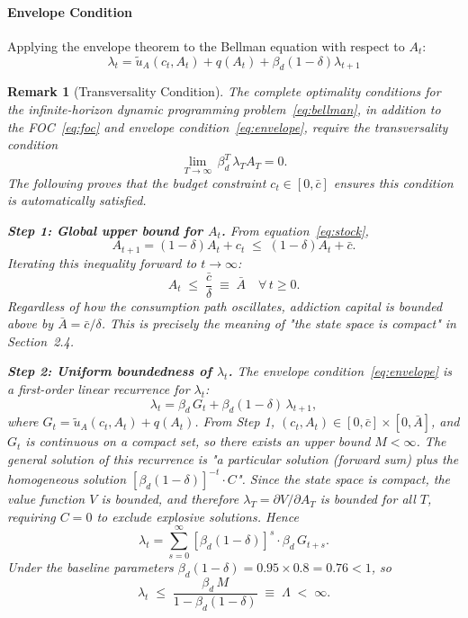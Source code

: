 \documentclass[12pt]{article}
\newtheorem{remark}{Remark}
\begin{document}
\paragraph{Envelope Condition}
 
Applying the envelope theorem to the Bellman equation with respect to $A_t$:
\begin{equation}
    \lambda_t = \tilde{u}_A(c_t, A_t) + q(A_t)
    + \beta_d(1-\delta)\lambda_{t+1}
    \label{eq:envelope}
\end{equation}

\begin{remark}[Transversality Condition]
    The complete optimality conditions for the infinite-horizon dynamic programming problem~\eqref{eq:bellman},
    in addition to the FOC~\eqref{eq:foc} and envelope condition~\eqref{eq:envelope},
    require the transversality condition
    \[
        \lim_{T\to\infty}\,\beta_d^T\,\lambda_T A_T = 0.
    \]
    The following proves that the budget constraint $c_t\in[0,\bar{c}]$ ensures this condition is automatically satisfied.
 
    \medskip
        \noindent\textbf{Step 1: Global upper bound for $A_t$.}\;
    From equation~\eqref{eq:stock},
    \[
        A_{t+1} = (1-\delta)A_t + c_t \;\leq\; (1-\delta)A_t + \bar{c}.
    \]
    Iterating this inequality forward to $t\to\infty$:
    \[
        A_t \;\leq\; \frac{\bar{c}}{\delta} \;\equiv\; \bar{A}
        \quad \forall\, t \geq 0.
    \]
        Regardless of how the consumption path oscillates, addiction capital is bounded above by $\bar{A}=\bar{c}/\delta$.
    This is precisely the meaning of "the state space is compact" in Section~2.4.
 
    \medskip
        \noindent\textbf{Step 2: Uniform boundedness of $\lambda_t$.}\;
    The envelope condition~\eqref{eq:envelope} is a first-order linear recurrence for $\lambda_t$:
    \[
        \lambda_t = \beta_d\,G_t + \beta_d(1-\delta)\,\lambda_{t+1},
    \]
        where $G_t = \tilde{u}_A(c_t, A_t) + q(A_t)$.
    From Step 1, $(c_t, A_t)\in[0,\bar{c}]\times[0,\bar{A}]$,
    and $G_t$ is continuous on a compact set, so there exists an upper bound $M<\infty$.
    The general solution of this recurrence is "a particular solution (forward sum) plus the homogeneous solution
    $[\beta_d(1-\delta)]^{-t}\cdot C$".
    Since the state space is compact, the value function $V$ is bounded,
    and therefore $\lambda_T = \partial V/\partial A_T$ is bounded for all $T$,
    requiring $C=0$ to exclude explosive solutions. Hence
    \[
        \lambda_t
        = \sum_{s=0}^{\infty}[\beta_d(1-\delta)]^s\cdot\beta_d\,G_{t+s}.
    \]
    Under the baseline parameters $\beta_d(1-\delta) = 0.95\times 0.8 = 0.76 < 1$, so
    \[
        \lambda_t \;\leq\;
        \frac{\beta_d\,M}{1 - \beta_d(1-\delta)} \;\equiv\; \Lambda \;<\; \infty.
    \]
 

\end{remark}
\end{document}
